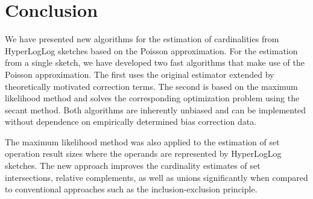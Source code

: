 \documentclass[a4paper]{scrartcl}
\begin{document}
\section{Conclusion}

We have presented new algorithms for the estimation of cardinalities from HyperLogLog sketches based on the Poisson approximation. For the estimation from a single sketch, we have developed two fast algorithms that make use of the Poisson approximation. The first uses the original estimator extended by theoretically motivated correction terms. The second is based on the maximum likelihood method and solves the corresponding optimization problem using the secant method. Both algorithms are inherently unbiased and can be implemented without dependence on empirically determined bias correction data.

The maximum likelihood method was also applied to the estimation of set operation result sizes where the operands are represented by HyperLogLog sketches. The new approach improves the cardinality estimates of set intersections, relative complements, as well as unions significantly when compared to conventional approaches such as the inclusion-exclusion principle.
\appendix
\end{document}
